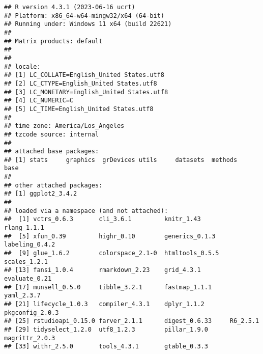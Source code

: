 \documentclass[
]{article}
\begin{document}
\begin{verbatim}
## R version 4.3.1 (2023-06-16 ucrt)
## Platform: x86_64-w64-mingw32/x64 (64-bit)
## Running under: Windows 11 x64 (build 22621)
## 
## Matrix products: default
## 
## 
## locale:
## [1] LC_COLLATE=English_United States.utf8 
## [2] LC_CTYPE=English_United States.utf8   
## [3] LC_MONETARY=English_United States.utf8
## [4] LC_NUMERIC=C                          
## [5] LC_TIME=English_United States.utf8    
## 
## time zone: America/Los_Angeles
## tzcode source: internal
## 
## attached base packages:
## [1] stats     graphics  grDevices utils     datasets  methods   base     
## 
## other attached packages:
## [1] ggplot2_3.4.2
## 
## loaded via a namespace (and not attached):
##  [1] vctrs_0.6.3       cli_3.6.1         knitr_1.43        rlang_1.1.1      
##  [5] xfun_0.39         highr_0.10        generics_0.1.3    labeling_0.4.2   
##  [9] glue_1.6.2        colorspace_2.1-0  htmltools_0.5.5   scales_1.2.1     
## [13] fansi_1.0.4       rmarkdown_2.23    grid_4.3.1        evaluate_0.21    
## [17] munsell_0.5.0     tibble_3.2.1      fastmap_1.1.1     yaml_2.3.7       
## [21] lifecycle_1.0.3   compiler_4.3.1    dplyr_1.1.2       pkgconfig_2.0.3  
## [25] rstudioapi_0.15.0 farver_2.1.1      digest_0.6.33     R6_2.5.1         
## [29] tidyselect_1.2.0  utf8_1.2.3        pillar_1.9.0      magrittr_2.0.3   
## [33] withr_2.5.0       tools_4.3.1       gtable_0.3.3
\end{verbatim}
\end{document}
